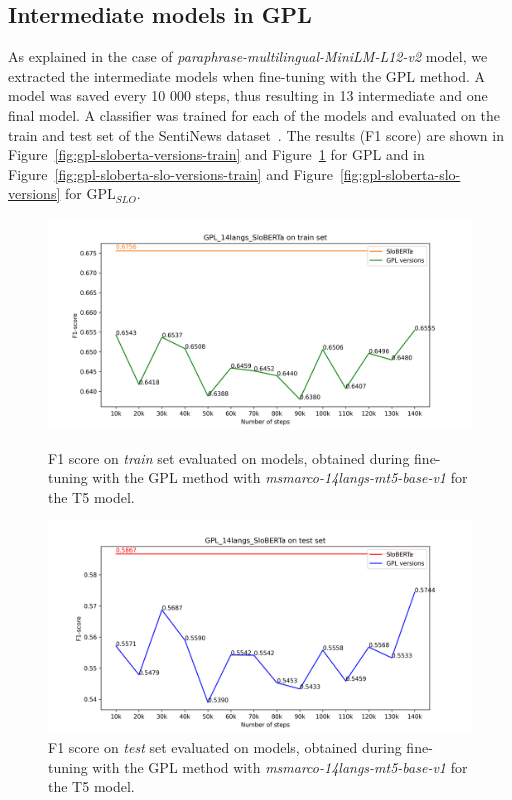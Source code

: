 \documentclass[fleqn,moreauthors,10pt]{ds_report}
\begin{document}
\subsection*{Intermediate models in GPL}
As explained in the case of {\it paraphrase-multilingual-MiniLM-L12-v2} model, we extracted the intermediate models when fine-tuning with the GPL method. A model was saved every 10 000 steps, thus resulting in 13 intermediate and one final model. A classifier was trained for each of the models and evaluated on the train and test set of the SentiNews dataset~\cite{sentiNews}. The results (F1 score) are shown in Figure~\ref{fig:gpl-sloberta-versions-train} and Figure~\ref{fig:gpl-sloberta-versions} for GPL and in Figure~\ref{fig:gpl-sloberta-slo-versions-train} and Figure~\ref{fig:gpl-sloberta-slo-versions} for $\text{GPL}_{SLO}$.

\begin{figure}
    \centering
    \begin{minipage}{0.5\textwidth}
        \centering
        \includegraphics[width=\linewidth]{graphs/GPL_14langs_SloBERTa_train.png}
        \caption{F1 score on \textit{train} set evaluated on models, obtained during fine-tuning with the GPL method with {\it msmarco-14langs-mt5-base-v1} \cite{msmarco14langs} for the T5 model.}
		\label{fig:gpl-sloberta-versions-train}
    \end{minipage}\hfill
    \begin{minipage}{0.5\textwidth}
        \centering
        \includegraphics[width=\linewidth]{graphs/GPL_14langs_SloBERTa_test.png}
        \caption{F1 score on \textit{test} set evaluated on models, obtained during fine-tuning with the GPL method with {\it msmarco-14langs-mt5-base-v1} \cite{msmarco14langs} for the T5 model.}
		\label{fig:gpl-sloberta-versions}
    \end{minipage}
\end{figure}
\end{document}

